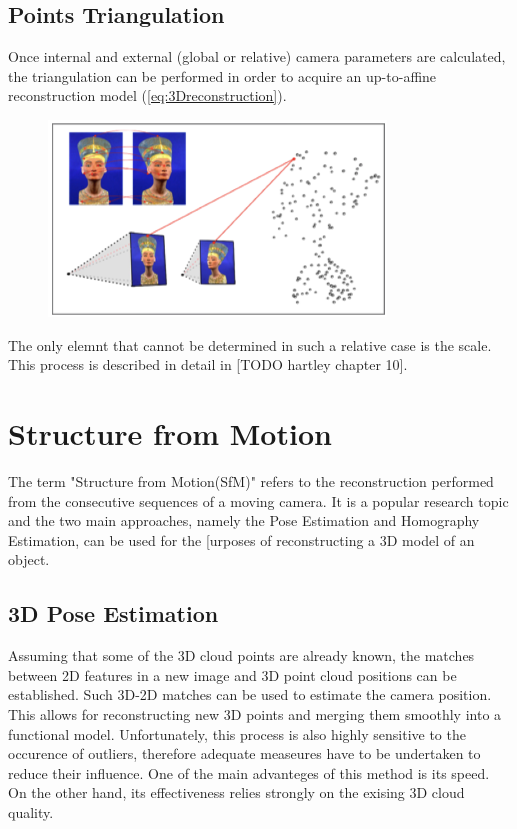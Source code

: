 \subsection{Points Triangulation}
Once internal and external (global or relative) camera parameters are calculated, the triangulation can be performed in order to acquire an up-to-affine reconstruction model (\ref{eq:3Dreconstruction}).
\begin{figure}[p]
    \centering
    \includegraphics[width=0.8\textwidth]{3Dreconstruction}
    \caption{}
    \label{fig:3Dreconstruction}
\end{figure}
The only elemnt that cannot be determined in such a relative case is the scale. This process is described in detail in [TODO hartley chapter 10].
\section{Structure from Motion}
The term "Structure from Motion(SfM)" refers to the reconstruction performed from the consecutive sequences of a moving camera. It is a popular research topic and the two main approaches, namely the Pose Estimation and Homography Estimation, can be used for the [urposes of reconstructing a 3D model of an object.
\subsection{3D Pose Estimation}
Assuming that some of the 3D cloud points are already known, the matches between 2D features in a new image and 3D point cloud positions can be established. Such 3D-2D matches can be used to estimate the camera position. This allows for reconstructing new 3D points and merging them smoothly into a functional model. Unfortunately,  this process is also highly sensitive to the occurence of outliers, therefore adequate measeures have to be undertaken to reduce their influence. One of the main advanteges of this method is its speed. On the other hand, its effectiveness relies strongly on the exising 3D cloud quality. 
